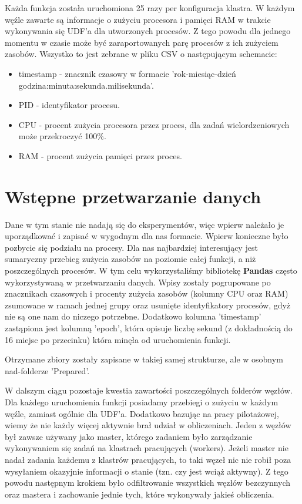 Każda funkcja została uruchomiona 25 razy per konfiguracja klastra. W każdym węźle zawarte są informacje o zużyciu procesora i pamięci RAM w trakcie wykonywania się UDF'a dla utworzonych procesów. Z tego powodu dla jednego momentu w czasie może być zaraportowanych parę procesów z ich zużyciem zasobów. Wszystko to jest zebrane w pliku CSV o następującym schemacie:
\begin{itemize}
    \item timestamp - znacznik czasowy w formacie 'rok-miesiąc-dzień godzina:minuta:sekunda.milisekunda'.
    \item PID - identyfikator procesu.
    \item CPU - procent zużycia procesora przez proces, dla zadań wielordzeniowych może przekroczyć 100\%.
    \item RAM - procent zużycia pamięci przez proces.
\end{itemize}
\section{Wstępne przetwarzanie danych}
Dane w tym stanie nie nadają się do eksperymentów, więc wpierw należało je uporządkować i zapisać w wygodnym dla nas formacie. Wpierw konieczne było pozbycie się podziału na procesy. Dla nas najbardziej interesujący jest sumaryczny przebieg zużycia zasobów na poziomie całej funkcji, a niż poszczególnych procesów. W tym celu wykorzystaliśmy bibliotekę \textbf{Pandas} często wykorzystywaną w przetwarzaniu danych. Wpisy zostały pogrupowane po znacznikach czasowych i procenty zużycia zasobów (kolumny CPU oraz RAM) zsumowane w ramach jednej grupy oraz usunięte identyfikatory procesów, gdyż nie są one nam do niczego potrzebne. Dodatkowo kolumna 'timestamp' zastąpiona jest kolumną 'epoch', która opisuje liczbę sekund (z dokładnością do 16 miejsc po przecinku) która minęła od uruchomienia funkcji.

Otrzymane zbiory zostały zapisane w takiej samej strukturze, ale w osobnym nad-folderze 'Prepared'.

W dalszym ciągu pozostaje kwestia zawartości poszczególnych folderów węzłów. Dla każdego uruchomienia funkcji posiadamy przebiegi o zużyciu w każdym węźle, zamiast ogólnie dla UDF'a. Dodatkowo bazując na pracy pilotażowej, wiemy że nie każdy więcej aktywnie brał udział w obliczeniach. Jeden z węzłów był zawsze używany jako master, którego zadaniem było zarządzanie wykonywaniem się zadań na klastrach pracujących (workers). Jeżeli master nie nadał zadania każdemu z klastrów pracujących, to taki węzeł nic nie robił poza wysyłaniem okazyjnie informacji o stanie (tzn. czy jest wciąż aktywny). Z tego powodu następnym krokiem było odfiltrowanie wszystkich węzłów bezczynnych oraz mastera i zachowanie jednie tych, które wykonywały jakieś obliczenia.

